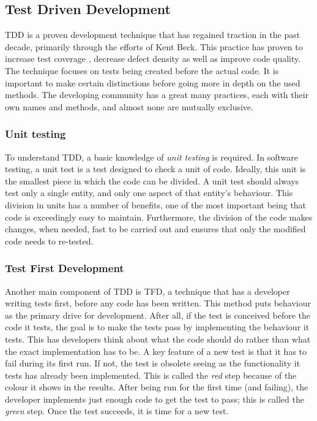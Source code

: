 \documentclass[11pt,british]{article}
\begin{document}
\subsection{Test Driven Development}
\label{subsec:TDD}
\gls{TDD} is a proven development technique that has regained traction in the past decade, primarily through the efforts of Kent Beck.\cite{VHDLUnit,agiletdd} This practice has proven to increase test coverage , decrease defect density as well as improve code quality.\cite{TDDinpractice,Siniaalto,BhatN06} The technique focuses on tests being created before the actual code. It is important to make certain distinctions before going more in depth on the used methods. The developing community has a great many practices, each with their own names and methods, and almost none are mutually exclusive.

\subsubsection{Unit testing}
To understand \gls{TDD}, a basic knowledge of \emph{unit testing} is required. In software testing, a unit test is a test designed to check a unit of code.\cite{extremeunit,VHDLUnit} Ideally, this unit is the smallest piece in which the code can be divided. A unit test should always test only a single entity, and only one aspect of that entity's behaviour. This division in units has a number of benefits, one of the most important being that code is exceedingly easy to maintain. Furthermore, the division of the code makes changes, when needed, fast to be carried out and ensures that only the modified code needs to re-tested.

\subsubsection{Test First Development}
Another main component of \gls{TDD} is \gls{TFD}, a technique that has a developer writing tests first, before any code has been written.\cite{extremeunit} This method puts behaviour as the primary drive for development. After all, if the test is conceived before the code it tests, the goal is to make the tests pass by implementing the behaviour it tests. This has developers think about what the code should do rather than what the exact implementation has to be. A key feature of a new test is that it has to fail during its first run. If not, the test is obsolete seeing as the functionality it tests has already been implemented. This is called the \emph{red} step because of the colour it shows in the results. After being run for the first time (and failing), the developer implements just enough code to get the test to pass; this is called the \emph{green} step. Once the test succeeds, it is time for a new test.
\end{document}
